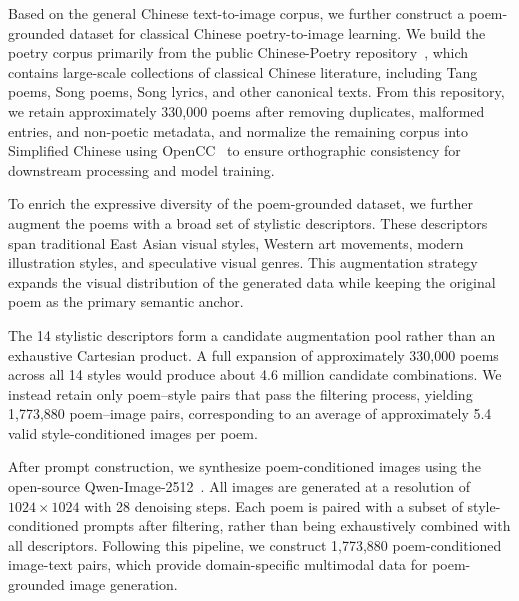 Based on the general Chinese text-to-image corpus, we further construct a poem-grounded dataset for classical Chinese poetry-to-image learning. We build the poetry corpus primarily from the public Chinese-Poetry repository~\cite{ChinesePoetry}, which contains large-scale collections of classical Chinese literature, including Tang poems, Song poems, Song lyrics, and other canonical texts. 
From this repository, we retain approximately 330,000 poems after removing duplicates, malformed entries, and non-poetic metadata, and normalize the remaining corpus into Simplified Chinese using OpenCC~\cite{BYVoidOpenCC} to ensure orthographic consistency for downstream processing and model training.

To enrich the expressive diversity of the poem-grounded dataset, we further augment the poems with a broad set of stylistic descriptors. These descriptors span traditional East Asian visual styles, Western art movements, modern illustration styles, and speculative visual genres. This augmentation strategy expands the visual distribution of the generated data while keeping the original poem as the primary semantic anchor.

The 14 stylistic descriptors form a candidate augmentation pool rather than an exhaustive Cartesian product. A full expansion of approximately 330,000 poems across all 14 styles would produce about 4.6 million candidate combinations. We instead retain only poem--style pairs that pass the filtering process, yielding 1,773,880 poem--image pairs, corresponding to an average of approximately 5.4 valid style-conditioned images per poem.

After prompt construction, we synthesize poem-conditioned images using the open-source Qwen-Image-2512~\cite{wu2025qwenimagetechnicalreport}. All images are generated at a resolution of $1024 \times 1024$ with 28 denoising steps. Each poem is paired with a subset of style-conditioned prompts after filtering, rather than being exhaustively combined with all descriptors. Following this pipeline, we construct 1,773,880 poem-conditioned image-text pairs, which provide domain-specific multimodal data for poem-grounded image generation.

